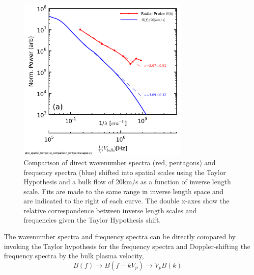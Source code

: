 \documentclass[aip,prl,amsmath,amssymb,reprint,superscriptaddress]{revtex4-1} %
\begin{document}
\begin{figure}[!htbp]
\centerline{
\includegraphics[width=8.5cm]{B_spatial_temporal_comp_wFits_40t60us}}
\caption{\label{fig:wavenumber_comp} Comparison of direct wavenumber spectra (red, pentagons) and frequency spectra (blue) shifted into spatial scales using the Taylor Hypothesis and a bulk flow of 20km/s as a function of inverse length scale. Fits are made to the same range in inverse length space and are indicated to the right of each curve. The double x-axes show the relative correspondence between inverse length scales and frequencies given the Taylor Hypothesis shift.}
\end{figure}

The wavenumber spectra and frequency spectra can be directly compared by invoking the Taylor hypothesis for the frequency spectra and Doppler-shifting the frequency spectra by the bulk plasma velocity,
\begin{equation}
B(f) \longrightarrow B(f-kV_{p}) \longrightarrow V_{p}B(k)
\label{eq:Taylor_Hyp}
\end{equation}
\end{document}
